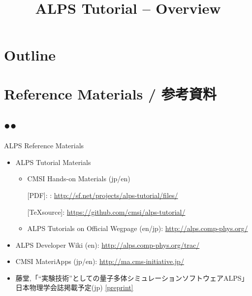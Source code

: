 
\title{ALPS Tutorial -- Overview}




\begin{frame}
  \titlepage
\end{frame}

\section*{Outline}
\begin{frame}[t,fragile]
  \tableofcontents
\end{frame}

\section{Reference Materials / 参考資料}
\subsection*{{\protect\color{red}●}{\protect\color{blue}●}}

\begin{frame}[t,fragile]{ALPS Reference Materials}
  \begin{itemize}
  \item ALPS Tutorial Materials
    \begin{itemize}
    \item CMSI Hands-on Materials (jp/en)
      
      [PDF]: : {\footnotesize \url{http://sf.net/projects/alps-tutorial/files/}}
      
      [\TeX source]: {\footnotesize \url{https://github.com/cmsi/alps-tutorial/}}
      
    \item ALPS Tutorials on Official Wegpage (en/jp): {\footnotesize \url{http://alps.comp-phys.org/}}
    \end{itemize}
  \item ALPS Developer Wiki (en): {\footnotesize \url{http://alps.comp-phys.org/trac/}}
  \item CMSI MateriApps (jp/en): {\footnotesize \url{http://ma.cms-initiative.jp/}}
  \item 藤堂,「``実験技術''としての量子多体シミュレーションソフトウェアALPS」日本物理学会誌掲載予定(jp) \href{http://exa.phys.s.u-tokyo.ac.jp/archive/alps-jps-2015.pdf}{\footnotesize [preprint]}
  \end{itemize}
\end{frame}

